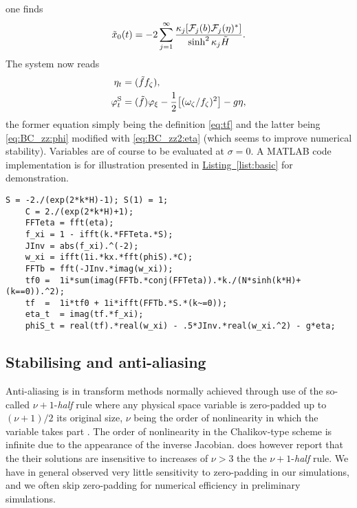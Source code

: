 \documentclass[a4paper,12pt]{article}
\newcommand{\mr}{\mathrm}
\newcommand{\mc}{\mathcal}
\renewcommand{\S}{^\mr{S}}
\renewcommand{\_}[1]{_\mr{#1}}
\let\Re\relax
\let\Im\relax
\DeclareMathOperator\Re{Re}
\DeclareMathOperator\Im{Im}
\newcommand{\lref}[2]{\href{#2}{#1~\ref*{#2}}}%
\newcommand{\zz}{\zeta}
\newcommand{\xx}{\xi}
\newcommand{\yy}{\sigma}
\newcommand{\kk}{\kappa}
\newcommand{\zmap}{f}
\newcommand{\ww}{\omega}
\newcommand{\Hzz}{\tilde H}
\newcommand{\hzz}{\eta}
\newcommand{\FF}{\mc F}
\newcommand{\tf}{\tilde \zmap}
\begin{document}
one finds
\begin{equation}
\tilde x_{0}(t) = -2\sum_{j=1}^\infty \frac{\kk_j \Im[\FF_j(b)\FF_j(\eta)^*]}{\sinh^2\kk_j\Hzz}.
\label{eq:tx0}
\end{equation}
The system now reads
\begin{subequations}
\begin{align}
\eta_t&= \Im(\tf \zmap_\zz), \\
\varphi\S_t &= \Re(\tf)\varphi_\xx  - \frac12\Re \big[(\ww_\zz/\zmap_\zz)^2\big]  - g \hzz,
\end{align}%
\label{eq:BC_zz2}%
\end{subequations}%
the former equation simply being the definition \eqref{eq:tf} and the latter being \eqref{eq:BC_zz:phi} modified with \eqref{eq:BC_zz2:eta} (which seems to improve numerical stability).
Variables are of course to be evaluated at $\yy=0$.
A MATLAB code implementation is for illustration presented in \lref{Listing}{list:basic} for demonstration.



%
\begin{lstlisting}[basicstyle=\ttfamily\small,label=list:basic,caption=Core implementation in MATLAB (without anti-aliasing)]
	S = -2./(exp(2*k*H)-1); S(1) = 1;
	C = 2./(exp(2*k*H)+1);
	FFTeta = fft(eta);
	f_xi = 1 - ifft(k.*FFTeta.*S);
	JInv = abs(f_xi).^(-2);
	w_xi = ifft(1i.*kx.*fft(phiS).*C);
	FFTb = fft(-JInv.*imag(w_xi));
	tf0 =  1i*sum(imag(FFTb.*conj(FFTeta)).*k./(N*sinh(k*H)+(k==0)).^2);
	tf  =  1i*tf0 + 1i*ifft(FFTb.*S.*(k~=0));
	eta_t  = imag(tf.*f_xi);
	phiS_t = real(tf).*real(w_xi) - .5*JInv.*real(w_xi.^2) - g*eta;
\end{lstlisting}

\subsection*{Stabilising and anti-aliasing}
Anti-aliasing is in transform methods \citep{orszag1970transform} normally achieved through use of the so-called $\nu+1$-\textit{half} rule where any physical space variable is zero-padded up to $(\nu+1)/2$ its original size, $\nu$ being the order of nonlinearity in which the variable takes part \citep{bonnefoy2010}.
The order of nonlinearity in the Chalikov-type scheme is infinite due to the appearance of the inverse Jacobian. \citet{chalikov2005modeling} does however report that the their solutions are insensitive to increases of $\nu>3$ the the $\nu+1$-\textit{half} rule.
We have in general observed very little sensitivity to zero-padding in our simulations, and we often skip zero-padding for numerical efficiency in preliminary simulations.
\\
\end{document}

